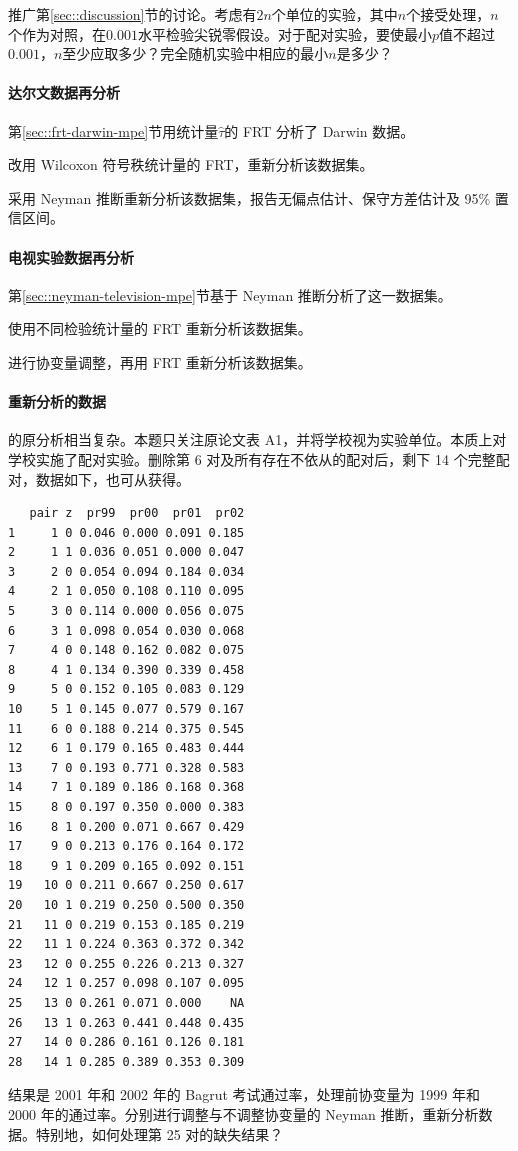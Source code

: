 推广第\ref{sec::discussion}节的讨论。考虑有$2n$个单位的实验，其中$n$个接受处理，$n$个作为对照，在$0.001$水平检验尖锐零假设。对于配对实验，要使最小$p$值不超过$0.001$，$n$至少应取多少？完全随机实验中相应的最小$n$是多少？
 

\paragraph{达尔文数据再分析}  
 
第\ref{sec::frt-darwin-mpe}节用统计量$\hat{\tau}$的 FRT 分析了 Darwin 数据。

改用 Wilcoxon 符号秩统计量的 FRT，重新分析该数据集。

采用 Neyman 推断重新分析该数据集，报告无偏点估计、保守方差估计及 95\% 置信区间。

\paragraph{电视实验数据再分析}  
第\ref{sec::neyman-television-mpe}节基于 Neyman 推断分析了这一数据集。

使用不同检验统计量的 FRT 重新分析该数据集。 

进行协变量调整，再用 FRT 重新分析该数据集。




\paragraph{重新分析\citet{angrist2009effects}的数据}\label{para::AL-mpe-neyman}

\citet{angrist2009effects}的原分析相当复杂。本题只关注原论文表 A1，并将学校视为实验单位。\citet{angrist2009effects}本质上对学校实施了配对实验。删除第 6 对及所有存在不依从的配对后，剩下 14 个完整配对，数据如下，也可从获得。 
\begin{lstlisting}
   pair z  pr99  pr00  pr01  pr02
1     1 0 0.046 0.000 0.091 0.185
2     1 1 0.036 0.051 0.000 0.047
3     2 0 0.054 0.094 0.184 0.034
4     2 1 0.050 0.108 0.110 0.095
5     3 0 0.114 0.000 0.056 0.075
6     3 1 0.098 0.054 0.030 0.068
7     4 0 0.148 0.162 0.082 0.075
8     4 1 0.134 0.390 0.339 0.458
9     5 0 0.152 0.105 0.083 0.129
10    5 1 0.145 0.077 0.579 0.167
11    6 0 0.188 0.214 0.375 0.545
12    6 1 0.179 0.165 0.483 0.444
13    7 0 0.193 0.771 0.328 0.583
14    7 1 0.189 0.186 0.168 0.368
15    8 0 0.197 0.350 0.000 0.383
16    8 1 0.200 0.071 0.667 0.429
17    9 0 0.213 0.176 0.164 0.172
18    9 1 0.209 0.165 0.092 0.151
19   10 0 0.211 0.667 0.250 0.617
20   10 1 0.219 0.250 0.500 0.350
21   11 0 0.219 0.153 0.185 0.219
22   11 1 0.224 0.363 0.372 0.342
23   12 0 0.255 0.226 0.213 0.327
24   12 1 0.257 0.098 0.107 0.095
25   13 0 0.261 0.071 0.000    NA
26   13 1 0.263 0.441 0.448 0.435
27   14 0 0.286 0.161 0.126 0.181
28   14 1 0.285 0.389 0.353 0.309
\end{lstlisting}
结果是 2001 年和 2002 年的 Bagrut 考试通过率，处理前协变量为 1999 年和 2000 年的通过率。分别进行调整与不调整协变量的 Neyman 推断，重新分析数据。特别地，如何处理第 25 对的缺失结果？ 
 
